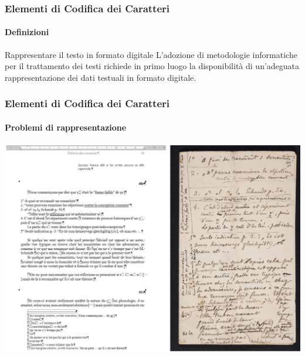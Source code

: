 


\begin{frame}
	\frametitle{Elementi di Codifica dei Caratteri}
	\framesubtitle{Definizioni}
	\addtocounter{nframe}{1}

	\begin{block}{Rappresentare il testo in formato digitale}
		L’adozione di metodologie informatiche per il trattamento dei testi richiede in primo luogo la disponibilità di un'adeguata rappresentazione dei dati testuali in formato digitale.
	\end{block}

\end{frame}

\begin{frame}
	\frametitle{Elementi di Codifica dei Caratteri}
	\framesubtitle{Problemi di rappresentazione}
	\addtocounter{nframe}{1}

	\begin{center}
		\includegraphics[width=.9\textwidth]{imgs/SaussureTrascrizione.pdf}
	\end{center}

\end{frame}


